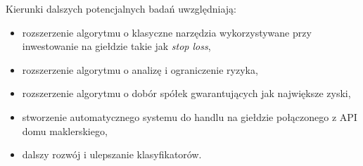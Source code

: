\documentclass[a4paper, twoside, 11pt, openright]{article}
\begin{document}
\bigskip

Kierunki dalszych potencjalnych badań uwzględniają:
\begin{itemize}
	\item rozszerzenie algorytmu o klasyczne narzędzia wykorzystywane przy inwestowanie na giełdzie takie jak \textit{stop loss},
	\item rozszerzenie algorytmu o analizę i ograniczenie ryzyka,
	\item rozszerzenie algorytmu o dobór spółek gwarantujących jak największe zyski,
	\item stworzenie automatycznego systemu do handlu na giełdzie połączonego z API domu maklerskiego,
	\item dalszy rozwój i ulepszanie klasyfikatorów.
\end{itemize}


\newpage

\end{document}
